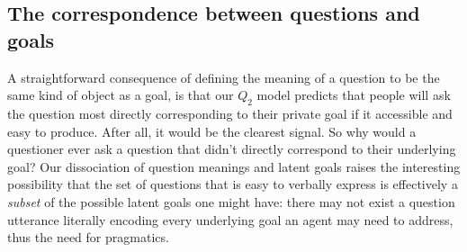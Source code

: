 \documentclass[11pt, floatsintext]{apa6}
\begin{document}

 
\subsection{The correspondence between questions and goals}

A straightforward consequence of defining the meaning of a question to be the same kind of object as a goal, is that our $Q_2$ model predicts that people will ask the question most directly corresponding to their private goal if it accessible and easy to produce.
After all, it would be the clearest signal.
So why would a questioner ever ask a question that didn't directly correspond to their underlying goal? 
Our dissociation of question meanings and latent goals raises the interesting possibility that the set of questions that is easy to verbally express is effectively a \emph{subset} of the possible latent goals one might have: there may not exist a question utterance literally encoding every underlying goal an agent may need to address, thus the need for pragmatics.
\end{document}
